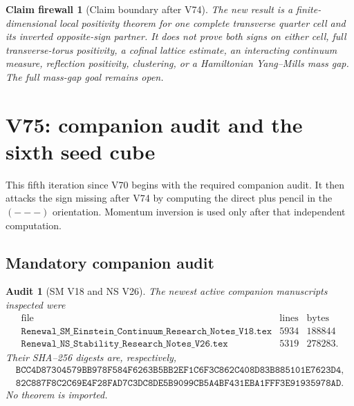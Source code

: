 \documentclass[11pt,oneside]{article}
\newtheorem{firewall}[theorem]{Claim firewall}
\newtheorem{audit}[theorem]{Audit}
\theoremstyle{definition}
\theoremstyle{remark}
\begin{document}
\begin{firewall}[Claim boundary after V74]
\label{fire:newv74-final}
The new result is a finite-dimensional local positivity theorem for
one complete transverse quarter cell and its inverted opposite-sign
partner.  It does not prove both signs on either cell, full
transverse-torus positivity, a cofinal lattice estimate, an
interacting continuum measure, reflection positivity, clustering,
or a Hamiltonian Yang--Mills mass gap.  The full mass-gap goal
remains open.
\end{firewall}

\section{V75: companion audit and the sixth seed cube}
\label{sec:newv75-sixth-seed}

This fifth iteration since V70 begins with the required companion
audit.  It then attacks the sign missing after V74 by computing the
direct plus pencil in the \((---)\) orientation.  Momentum inversion
is used only after that independent computation.

\subsection{Mandatory companion audit}

\begin{audit}[SM V18 and NS V26]
\label{aud:newv75-companions}
The newest active companion manuscripts inspected were
\[
\begin{array}{c|r|r}
\text{file}&\text{lines}&\text{bytes}\\ \hline
\texttt{Renewal\_SM\_Einstein\_Continuum\_Research\_Notes\_V18.tex}
  &5934&188844\\
\texttt{Renewal\_NS\_Stability\_Research\_Notes\_V26.tex}
  &5319&278283.
\end{array}                                             \tag{75.1}
\]
Their SHA--256 digests are, respectively,
\[
\begin{gathered}
\texttt{BCC4D87304579BB978F584F6263B5BB2EF1C6F3C862C408D83B885101E7623D4},\\
\texttt{82C887F8C2C69E4F28FAD7C3DC8DE5B9099CB5A4BF431EBA1FFF3E91935978AD}.
\end{gathered}                                          \tag{75.2}
\]
No theorem is imported.
\end{audit}
\end{document}
